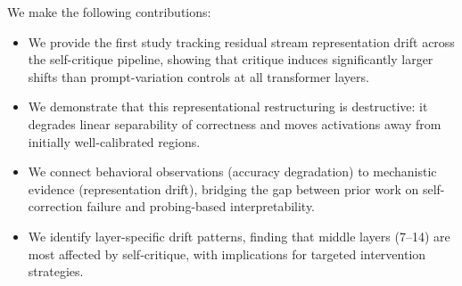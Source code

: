 We make the following contributions:
\begin{itemize}[leftmargin=*,itemsep=0pt,topsep=0pt]
    \item We provide the first study tracking residual stream representation drift across the self-critique pipeline, showing that critique induces significantly larger shifts than prompt-variation controls at all transformer layers.
    \item We demonstrate that this representational restructuring is destructive: it degrades linear separability of correctness and moves activations away from initially well-calibrated regions.
    \item We connect behavioral observations (accuracy degradation) to mechanistic evidence (representation drift), bridging the gap between prior work on self-correction failure and probing-based interpretability.
    \item We identify layer-specific drift patterns, finding that middle layers (7--14) are most affected by self-critique, with implications for targeted intervention strategies.
\end{itemize}
